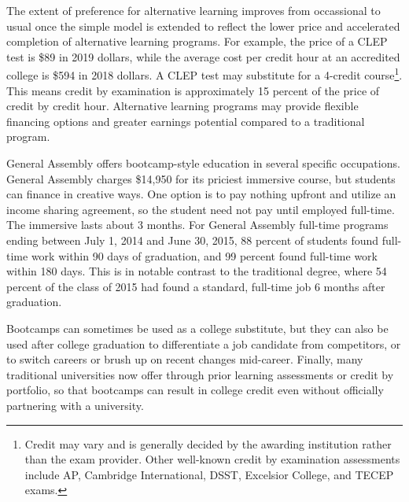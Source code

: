 \documentclass[AER]{./aea-latex-templates/AEA}
\begin{document}
        The extent of preference for alternative learning improves from
        occassional to usual once the simple model is extended to reflect the
        lower price and accelerated completion of alternative learning programs.
        For example, the price of a CLEP test is \$89 in 2019 dollars\cite{collegeboard_2019}, while
        the average cost per credit hour at an accredited college is \$594 in 2018
        dollars\cite{kirkham2018study}. A CLEP test may substitute for a 4-credit course\footnote{Credit
        may vary and is generally decided by the awarding institution rather than
        the exam provider. Other well-known credit by examination assessments include AP, Cambridge International, DSST, Excelsior
        College, and TECEP exams.}. This means credit by examination is approximately 15 percent of the price of credit by credit hour.
        Alternative learning programs may provide flexible financing options and greater earnings potential compared to a traditional program.
        
        General Assembly offers bootcamp-style education in several specific occupations. General Assembly
        charges \$14,950 for its priciest immersive course, but students
        can finance in creative ways. One option is to pay nothing upfront and utilize an income sharing
        agreement, so the student need not pay until employed full-time\cite{ga2019}.
        The immersive lasts about 3 months. For General Assembly
        full-time programs ending between July 1, 2014 and June 30, 2015, 88 percent of students found full-time
        work within 90 days of graduation, and 99 percent found full-time work within 180
        days\cite{kirkham_2017}. This is in notable contrast to the traditional degree, where 54 percent of
        the class of 2015 had found a standard, full-time job 6 months after
        graduation\cite{wexler_2016}.
        
        Bootcamps can sometimes be used as a college substitute, but they can also
        be used after college graduation to differentiate a job candidate from
        competitors, or to switch careers or brush up on recent changes
        mid-career. Finally, many traditional universities now offer through prior
        learning assessments or credit by portfolio, so that bootcamps can result
        in college credit even without officially partnering with a university\cite{aceposttraditionallearners}.
\end{document}
